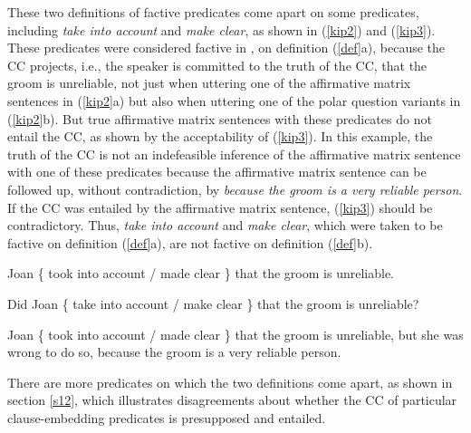 \documentclass[11pt,fleqn]{article}
\newcommand{\6}{\mbox{$[\hspace*{-.6mm}[$}}
\newcommand{\9}{\mbox{$]\hspace*{-.6mm}]$}}
\begin{document}
%
%


These two definitions of factive predicates come apart on some predicates, including {\em take into account} and {\em make clear}, as shown in (\ref{kip2}) and (\ref{kip3}). These predicates were considered factive in \citealt{kiparsky-kiparsky70}, on definition (\ref{def}a), because the CC projects, i.e., the speaker is committed to the truth of the CC, that the groom is unreliable, not just when uttering one of the affirmative matrix sentences in (\ref{kip2}a) but also when uttering one of the polar question variants in (\ref{kip2}b). But true affirmative matrix sentences with these predicates do not entail the CC, as shown by the acceptability of (\ref{kip3}). In this example, the truth of the CC is not an indefeasible inference of the affirmative matrix sentence with one of these predicates because the affirmative matrix sentence can be followed up, without contradiction, by {\em because the groom is a very reliable person}. If the CC was entailed by the affirmative matrix sentence, (\ref{kip3}) should be contradictory. Thus, {\em take into account} and {\em make clear}, which were taken to be factive on definition (\ref{def}a), are not factive on definition (\ref{def}b).

\begin{exe}
\ex\label{kip2}
\begin{xlist}
\ex Joan  \{ took into account /  made clear \}  that the groom is unreliable.

\ex Did Joan \{ take into account / make clear \} that the groom is unreliable?
\end{xlist}
\ex\label{kip3} Joan  \{ took into account / made clear \} that the groom is unreliable, but she was wrong to do so, because the groom is a very reliable person.
\end{exe}
There are more predicates on which the two definitions come apart, as shown in section \ref{s12}, which illustrates disagreements about whether the CC of particular clause-embedding predicates is presupposed and entailed.
\end{document}
